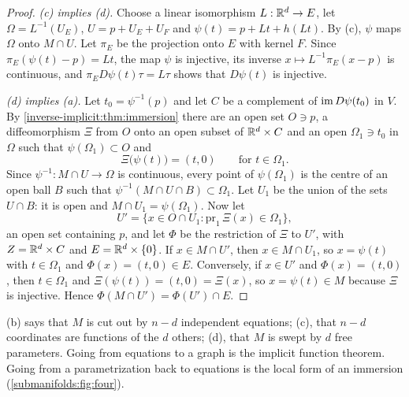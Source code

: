 \begin{notechapter}
\begin{proof}
\emph{(c) implies (d).} Choose a linear isomorphism $L:\mathbb{R}^d\to E$, let
$\Omega = L^{-1}(U_E)$, $U = p + U_E + U_F$ and
$\psi(t) = p + Lt + h(Lt)$. By (c), $\psi$ maps $\Omega$ onto $M\cap U$.
Let $\pi_E$ be the projection onto $E$ with kernel $F$. Since
$\pi_E(\psi(t) - p) = Lt$, the map $\psi$ is injective, its inverse
$x\mapsto L^{-1}\pi_E(x - p)$ is continuous, and
$\pi_E D\psi(t)\tau = L\tau$ shows that $D\psi(t)$ is injective.

\emph{(d) implies (a).} Let $t_0 = \psi^{-1}(p)$ and let $C$ be a
complement of $\operatorname{im} D\psi(t_0)$ in $V$. By
\cref{inverse-implicit:thm:immersion} there are an open set $O\ni p$, a
diffeomorphism $\Xi$ from $O$ onto an open subset of $\mathbb{R}^d\times C$ and an
open $\Omega_1\ni t_0$ in $\Omega$ such that $\psi(\Omega_1)\subset O$ and
\[
  \Xi\bigl(\psi(t)\bigr) = (t, 0) \qquad\text{for } t\in\Omega_1 .
\]
Since $\psi^{-1}:M\cap U\to\Omega$ is continuous, every point of
$\psi(\Omega_1)$ is the centre of an open ball $B$ such that
$\psi^{-1}(M\cap U\cap B)\subset\Omega_1$. Let $U_1$ be the union of the
sets $U\cap B$: it is open and $M\cap U_1 = \psi(\Omega_1)$. Now let
\[
  U' = \bigl\{x\in O\cap U_1 : \mathrm{pr}_1\,\Xi(x)\in\Omega_1\bigr\} ,
\]
an open set containing $p$, and let $\Phi$ be the restriction of $\Xi$ to
$U'$, with $Z = \mathbb{R}^d\times C$ and $E = \mathbb{R}^d\times\{0\}$. If
$x\in M\cap U'$, then $x\in M\cap U_1$, so $x = \psi(t)$ with
$t\in\Omega_1$ and $\Phi(x) = (t, 0)\in E$. Conversely, if $x\in U'$ and
$\Phi(x) = (t, 0)$, then $t\in\Omega_1$ and
$\Xi(\psi(t)) = (t, 0) = \Xi(x)$, so $x = \psi(t)\in M$ because $\Xi$ is
injective. Hence $\Phi(M\cap U') = \Phi(U')\cap E$.
\end{proof}

\begin{intuition}
(b) says that $M$ is cut out by $n - d$ independent equations; (c), that
$n - d$ coordinates are functions of the $d$ others; (d), that $M$ is
swept by $d$ free parameters. Going from equations to a graph is the
implicit function theorem. Going from a parametrization back to equations
is the local form of an immersion
(\cref{submanifolds:fig:four}).
\end{intuition}


\end{notechapter}
